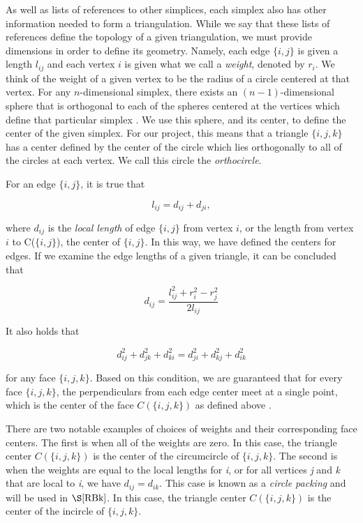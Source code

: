 \documentclass[12pt]{article}
\begin{document}
 As well as lists of references to other simplices, each simplex also has other information needed to form a triangulation. While we say that these lists of references define the topology of a given triangulation, we must provide dimensions in order to define its geometry. Namely, each edge $\{i, j\}$ is given a length $l_{ij}$ and each vertex $i$ is given what we call a \textit{weight}, denoted by $r_i$. We think of the weight of a given vertex to be the radius of a circle centered at that vertex. For any $\textit{n}$-dimensional simplex, there exists an $(n-1)$-dimensional sphere that is orthogonal to each of the spheres centered at the vertices which define that particular simplex \cite{Dave}. We use this sphere, and its center, to define the center of the given simplex. For our project, this means that a triangle $\{i, j, k\}$ has a center defined by the center of the circle which lies orthogonally to all of the circles at each vertex. We call this circle the \textit{orthocircle}. 

 For an edge $\{i, j\}$, it is true that 

$$l_{ij} = d_{ij} + d_{ji},$$

 where $d_{ij}$ is the \textit{local length} of edge $\{i, j\}$ from vertex $i$, or the length from vertex $i$ to C($\{i, j\}$), the center of $\{i, j\}$. In this way, we have defined the centers for edges. If we examine the edge lengths of a given triangle, it can be concluded that 

\begin{equation}
d_{ij} = \frac{l_{ij}^2 + r_i^2 - r_j^2}{2l_{ij}}
\label{eq2}
\end{equation}

 It also holds that 

\begin{equation}
\label{eq1}
d_{ij}^2 + d_{jk}^2 + d_{ki}^2 = d_{ji}^2 + d_{kj}^2 + d_{ik}^2
\end{equation}

 for any face $\{i, j, k\}$. Based on this condition, we are guaranteed that for every face $\{i, j, k\}$, the perpendiculars from each edge center meet at a single point, which is the center of the face $C(\{i, j, k\})$ as defined above \cite{Dave}.

 There are two notable examples of choices of weights and their corresponding face centers. The first is when all of the weights are zero. In this case, the triangle center $C(\{i, j, k\})$ is the center of the circumcircle of $\{i, j, k\}$. The second is when the weights are equal to the local lengths for \textit{i}, or for all vertices \textit{j} and \textit{k} that are local to \textit{i}, we have $d_{ij} = d_{ik}$. This case is known as a \textit{circle packing} and will be used in $\S\ref{RBk}$. In this case, the triangle center $C(\{i, j, k\})$ is the center of the incircle of $\{i, j, k\}$.
\end{document}
